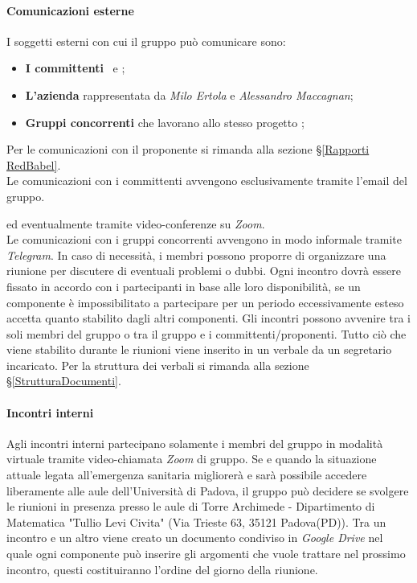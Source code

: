 \paragraph*{Comunicazioni esterne}
I soggetti esterni con cui il gruppo può comunicare sono: 
\begin{itemize}
	\item \textbf{I committenti} \VT\ e \CR;
	\item \textbf{L'azienda \Proponente} rappresentata da \textit{Milo Ertola} e \textit{Alessandro Maccagnan};
	\item \textbf{Gruppi concorrenti} che lavorano allo stesso progetto \NomeProgetto;
\end{itemize}
Per le comunicazioni con il proponente si rimanda alla sezione \S\ref{Rapporti RedBabel}.\\
Le comunicazioni con i committenti avvengono esclusivamente tramite l'email del gruppo.
\begin{center}
	 \textbf{\Mail} 
\end{center} ed eventualmente tramite video-conferenze su \textit{Zoom}.\\
Le comunicazioni con i gruppi concorrenti avvengono in modo informale tramite \textit{Telegram}.
In caso di necessità, i membri possono proporre di organizzare una riunione per discutere di eventuali problemi o dubbi. Ogni incontro dovrà essere fissato in accordo con i partecipanti in base alle loro disponibilità, se un componente è impossibilitato a partecipare per un periodo eccessivamente esteso accetta quanto stabilito dagli altri componenti. Gli incontri possono avvenire tra i soli membri del gruppo o tra il gruppo e i committenti/proponenti. 
Tutto ciò che viene stabilito durante le riunioni viene inserito in un verbale da un segretario incaricato. Per la struttura dei verbali si rimanda alla sezione \S\ref{StrutturaDocumenti}.
\paragraph*{Incontri interni}
Agli incontri interni partecipano solamente i membri del gruppo in modalità virtuale tramite video-chiamata \textit{Zoom} di gruppo.
Se e quando la situazione attuale legata all'emergenza sanitaria migliorerà e sarà possibile accedere liberamente alle aule dell'Università di Padova, il gruppo può decidere se svolgere le riunioni in presenza presso le aule di Torre Archimede - Dipartimento di Matematica "Tullio Levi Civita" (Via Trieste 63, 35121 Padova(PD)).
Tra un incontro e un altro viene creato un documento condiviso in \textit{Google Drive} nel quale ogni componente può inserire gli argomenti che vuole trattare nel prossimo incontro, questi costituiranno l'ordine del giorno della riunione.
